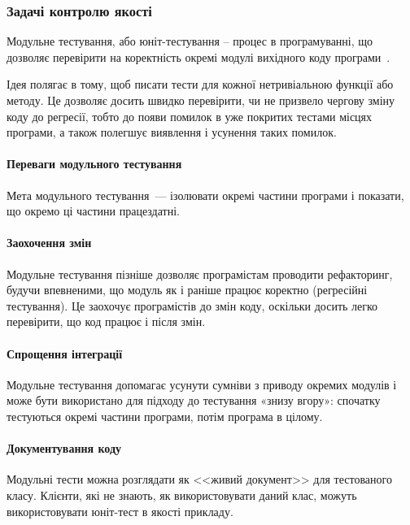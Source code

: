\subsubsection{Задачі контролю якості}

Модульне тестування, або юніт-тестування -- процес в програмуванні, що дозволяє перевірити на коректність окремі модулі вихідного коду програми~\cite{бородіна2018selenium}.

Ідея полягає в тому, щоб писати тести для кожної нетривіальною функції або методу. Це дозволяє досить швидко перевірити, чи не призвело чергову зміну коду до регресії, тобто до появи помилок в уже покритих тестами місцях програми, а також полегшує виявлення і усунення таких помилок.

\paragraph{Переваги модульного тестування}

Мета модульного тестування~--- ізолювати окремі частини програми і показати, що окремо ці частини працездатні.

\paragraph{Заохочення змін}

Модульне тестування пізніше дозволяє програмістам проводити рефакторинг, будучи впевненими, що модуль як і раніше працює коректно (регресійні тестування). Це заохочує програмістів до змін коду, оскільки досить легко перевірити, що код працює і після змін.

\paragraph{Спрощення інтеграції}
Модульне тестування допомагає усунути сумніви з приводу окремих модулів і може бути використано для підходу до тестування «знизу вгору»: спочатку тестуються окремі частини програми, потім програма в цілому.

\paragraph{Документування коду}

Модульні тести можна розглядати як <<живий документ>> для тестованого класу. Клієнти, які не знають, як використовувати даний клас, можуть використовувати юніт-тест в якості прикладу.

